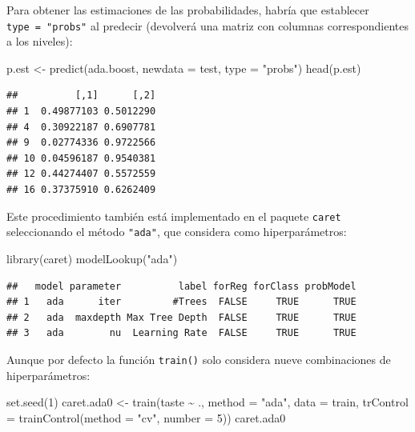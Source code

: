 \documentclass[
  spanish,
]{book}
\newenvironment{Shaded}{\begin{snugshade}}{\end{snugshade}}
\newcommand{\AttributeTok}[1]{\textcolor[rgb]{0.77,0.63,0.00}{#1}}
\newcommand{\DecValTok}[1]{\textcolor[rgb]{0.00,0.00,0.81}{#1}}
\newcommand{\FunctionTok}[1]{\textcolor[rgb]{0.00,0.00,0.00}{#1}}
\newcommand{\NormalTok}[1]{#1}
\newcommand{\OtherTok}[1]{\textcolor[rgb]{0.56,0.35,0.01}{#1}}
\newcommand{\SpecialCharTok}[1]{\textcolor[rgb]{0.00,0.00,0.00}{#1}}
\newcommand{\StringTok}[1]{\textcolor[rgb]{0.31,0.60,0.02}{#1}}
\theoremstyle{break}
\theoremstyle{definition}
\theoremstyle{definition}
\theoremstyle{definition}
\theoremstyle{definition}
\theoremstyle{remark}
\begin{document}
Para obtener las estimaciones de las probabilidades, habría que establecer \texttt{type\ =\ "probs"} al predecir (devolverá una matriz con columnas correspondientes a los niveles):

\begin{Shaded}
\begin{Highlighting}[]
\NormalTok{p.est }\OtherTok{\textless{}{-}} \FunctionTok{predict}\NormalTok{(ada.boost, }\AttributeTok{newdata =}\NormalTok{ test, }\AttributeTok{type =} \StringTok{"probs"}\NormalTok{)}
\FunctionTok{head}\NormalTok{(p.est)}
\end{Highlighting}
\end{Shaded}

\begin{verbatim}
##          [,1]      [,2]
## 1  0.49877103 0.5012290
## 4  0.30922187 0.6907781
## 9  0.02774336 0.9722566
## 10 0.04596187 0.9540381
## 12 0.44274407 0.5572559
## 16 0.37375910 0.6262409
\end{verbatim}

Este procedimiento también está implementado en el paquete \texttt{caret} seleccionando el método \texttt{"ada"}, que considera como hiperparámetros:

\begin{Shaded}
\begin{Highlighting}[]
\FunctionTok{library}\NormalTok{(caret)}
\FunctionTok{modelLookup}\NormalTok{(}\StringTok{"ada"}\NormalTok{)}
\end{Highlighting}
\end{Shaded}

\begin{verbatim}
##   model parameter          label forReg forClass probModel
## 1   ada      iter         #Trees  FALSE     TRUE      TRUE
## 2   ada  maxdepth Max Tree Depth  FALSE     TRUE      TRUE
## 3   ada        nu  Learning Rate  FALSE     TRUE      TRUE
\end{verbatim}

Aunque por defecto la función \texttt{train()} solo considera nueve combinaciones de hiperparámetros:

\begin{Shaded}
\begin{Highlighting}[]
\FunctionTok{set.seed}\NormalTok{(}\DecValTok{1}\NormalTok{)}
\NormalTok{caret.ada0 }\OtherTok{\textless{}{-}} \FunctionTok{train}\NormalTok{(taste }\SpecialCharTok{\textasciitilde{}}\NormalTok{ ., }\AttributeTok{method =} \StringTok{"ada"}\NormalTok{, }\AttributeTok{data =}\NormalTok{ train,}
                   \AttributeTok{trControl =} \FunctionTok{trainControl}\NormalTok{(}\AttributeTok{method =} \StringTok{"cv"}\NormalTok{, }\AttributeTok{number =} \DecValTok{5}\NormalTok{))}
\NormalTok{caret.ada0}
\end{Highlighting}
\end{Shaded}
\end{document}
